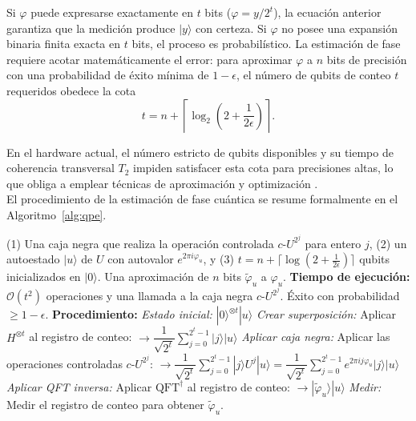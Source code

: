 \documentclass[12pt, spanish]{book}
\begin{document}
Si $\varphi$ puede expresarse exactamente en $t$ bits ($\varphi = y/2^t$), la ecuación anterior garantiza que la medición produce $|y\rangle$ con certeza. Si $\varphi$ no posee una expansión binaria finita exacta en $t$ bits, el proceso es probabilístico. La estimación de fase requiere acotar matemáticamente el error: para aproximar $\varphi$ a $n$ bits de precisión con una probabilidad de éxito mínima de $1-\epsilon$, el número de qubits de conteo $t$ requeridos obedece la cota \cite{Nielsen2024}
\begin{equation}
    t = n + \left\lceil \log_2\left( 2 + \frac{1}{2\epsilon} \right) \right\rceil.
    \label{eq:qpe_cota}
\end{equation}

En el hardware actual, el número estricto de qubits disponibles y su tiempo de coherencia transversal $T_2$ impiden satisfacer esta cota para precisiones altas, lo que obliga a emplear técnicas de aproximación y optimización \cite{villarreal}.\\

El procedimiento de la estimación de fase cuántica se resume formalmente en el Algoritmo~\ref{alg:qpe}.

\begin{algorithm}[H]
    \caption{Estimación de fase cuántica (QPE) \cite{Nielsen2024}}
    \label{alg:qpe}
    \begin{algorithmic}[1]
        \Require (1) Una caja negra que realiza la operación controlada $c$-$U^{2^j}$ para entero $j$, (2) un autoestado $|u\rangle$ de $U$ con autovalor $e^{2\pi i \varphi_u}$, y (3) $t = n + \lceil \log(2 + \frac{1}{2\epsilon}) \rceil$ qubits inicializados en $|0\rangle$.
        \Ensure Una aproximación de $n$ bits $\widetilde{\varphi}_u$ a $\varphi_u$.
        \Statex \textbf{Tiempo de ejecución:} $\mathcal{O}(t^2)$ operaciones y una llamada a la caja negra $c$-$U^{2^j}$. Éxito con probabilidad $\geq 1 - \epsilon$.
        \Statex
        \Statex \textbf{Procedimiento:}
        \State \textit{Estado inicial:} $|0\rangle^{\otimes t}|u\rangle$
        \State \textit{Crear superposición:} Aplicar $H^{\otimes t}$ al registro de conteo:
        \Statex \hspace{2em} $\to \dfrac{1}{\sqrt{2^t}} \displaystyle\sum_{j=0}^{2^t-1} |j\rangle |u\rangle$
        \State \textit{Aplicar caja negra:} Aplicar las operaciones controladas $c$-$U^{2^j}$:
        \Statex \hspace{2em} $\to \dfrac{1}{\sqrt{2^t}} \displaystyle\sum_{j=0}^{2^t-1} |j\rangle U^{j}|u\rangle = \dfrac{1}{\sqrt{2^t}} \displaystyle\sum_{j=0}^{2^t-1} e^{2\pi i j \varphi_u} |j\rangle |u\rangle$
        \State \textit{Aplicar QFT inversa:} Aplicar $\mathrm{QFT}^{\dagger}$ al registro de conteo:
        \Statex \hspace{2em} $\to |\widetilde{\varphi}_u\rangle|u\rangle$
        \State \textit{Medir:} Medir el registro de conteo para obtener $\widetilde{\varphi}_u$.
    \end{algorithmic}
\end{algorithm}
\end{document}
